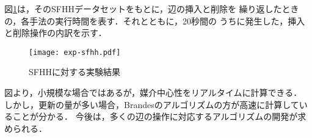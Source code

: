 図\ref{fig:exp-sfhh}は，そのSFHHデータセットをもとに，辺の挿入と削除を
繰り返したときの，各手法の実行時間を表す．それとともに，20秒間の
うちに発生した，挿入と削除操作の内訳を示す．

\begin{figure}[tb]
  \centering
  \texttt{[image: exp-sfhh.pdf]}
  \caption{SFHHに対する実験結果}
  \label{fig:exp-sfhh}
\end{figure}

図より，小規模な場合ではあるが，媒介中心性をリアルタイムに計算できる．
しかし，更新の量が多い場合，Brandesのアルゴリズムの方が高速に計算していることが分かる．
今後は，多くの辺の操作に対応するアルゴリズムの開発が求められる．
